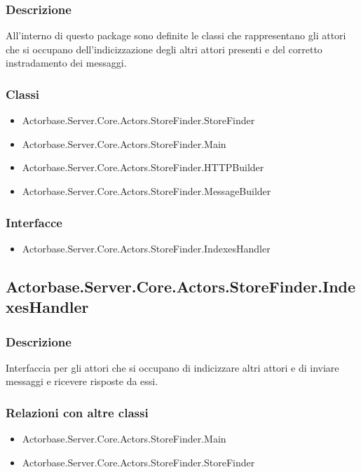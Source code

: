 \documentclass[a4paper]{article}
\begin{document}
			\subsubsection{Descrizione}
				All'interno di questo package sono definite le classi che rappresentano gli attori che si occupano dell'indicizzazione degli altri attori presenti e del corretto instradamento dei messaggi.
			\subsubsection{Classi}
			\begin{itemize}
				\item Actorbase.Server.Core.Actors.StoreFinder.StoreFinder
				\item Actorbase.Server.Core.Actors.StoreFinder.Main
				\item Actorbase.Server.Core.Actors.StoreFinder.HTTPBuilder
				\item Actorbase.Server.Core.Actors.StoreFinder.MessageBuilder
			\end{itemize}
			\subsubsection{Interfacce}
			\begin{itemize}
				\item Actorbase.Server.Core.Actors.StoreFinder.IndexesHandler
			\end{itemize}

		\subsection{Actorbase.Server.Core.Actors.StoreFinder.IndexesHandler}
			\subsubsection{Descrizione}
				Interfaccia per gli attori che si occupano di indicizzare altri attori e di inviare messaggi e ricevere risposte da essi.
			\subsubsection{Relazioni con altre classi}
			\begin{itemize}
				\item Actorbase.Server.Core.Actors.StoreFinder.Main
				\item Actorbase.Server.Core.Actors.StoreFinder.StoreFinder
			\end{itemize}
\end{document}
